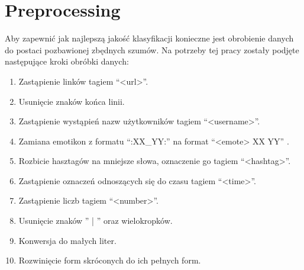 \newpage %
\section{Preprocessing}

Aby zapewnić jak najlepszą jakość klasyfikacji konieczne jest obrobienie danych do postaci pozbawionej zbędnych szumów. Na potrzeby tej pracy zostały podjęte następujące kroki obróbki danych:


\begin{enumerate}
    \item Zastąpienie linków tagiem “<url>”.
    \item Usunięcie znaków końca linii.
    \item Zastąpienie wystąpień nazw użytkowników tagiem  “<username>”.
    \item Zamiana emotikon z formatu “:XX\_YY:” na format “<emote> XX YY” .
    \item Rozbicie hasztagów na mniejsze słowa, oznaczenie go tagiem “<hashtag>”.
    \item Zastąpienie oznaczeń odnoszących się do czasu tagiem “<time>”.
    \item Zastąpienie liczb tagiem “<number>”.
    \item Usunięcie znaków  '' | ''  oraz wielokropków.
    \item Konwersja do małych liter.
    \item Rozwinięcie form skróconych do ich pełnych form.
\end{enumerate}

